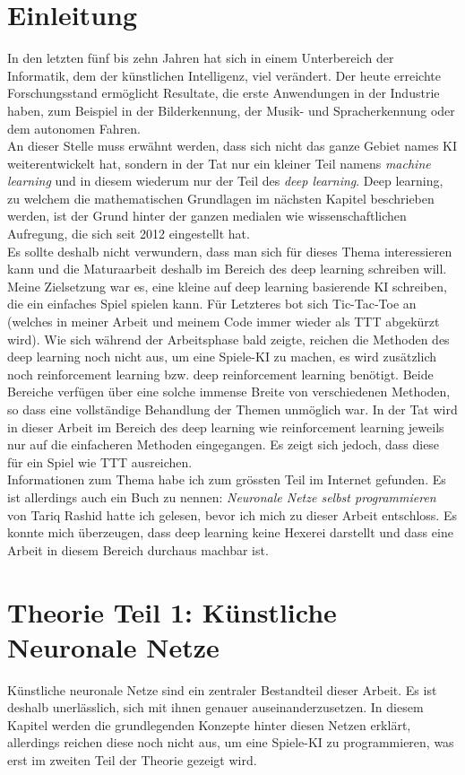 \documentclass[12pt,a4paper]{article}
\begin{document}
\section{Einleitung}
In den letzten fünf bis zehn Jahren hat sich in einem Unterbereich der Informatik, dem der künstlichen Intelligenz, viel verändert. Der heute erreichte Forschungsstand ermöglicht Resultate, die erste Anwendungen in der Industrie haben, zum Beispiel in der Bilderkennung, der Musik- und Spracherkennung oder dem autonomen Fahren. \cite{topdlapp}\\
An dieser Stelle muss erwähnt werden, dass sich nicht das ganze Gebiet names KI weiterentwickelt hat, sondern in der Tat nur ein kleiner Teil namens \textit{machine learning} und in diesem wiederum nur der Teil des \textit{deep learning}. Deep learning, zu welchem die mathematischen Grundlagen im nächsten Kapitel beschrieben werden, ist der Grund hinter der ganzen medialen wie wissenschaftlichen Aufregung, die sich seit 2012 eingestellt hat.\cite{dlrwiki}\\
Es sollte deshalb nicht verwundern, dass man sich für dieses Thema interessieren kann und die Maturaarbeit deshalb im Bereich des deep learning schreiben will.
Meine Zielsetzung war es, eine kleine auf deep learning basierende KI schreiben, die ein einfaches Spiel spielen kann. Für Letzteres bot sich Tic-Tac-Toe an (welches in meiner Arbeit und meinem Code immer wieder als TTT abgekürzt wird).
Wie sich während der Arbeitsphase bald zeigte, reichen die Methoden des deep learning noch nicht aus, um eine Spiele-KI zu machen, es wird zusätzlich noch reinforcement learning bzw. deep reinforcement learning benötigt. Beide Bereiche verfügen über eine solche immense Breite von verschiedenen Methoden, so dass eine vollständige Behandlung der Themen unmöglich war. In der Tat wird in dieser Arbeit im Bereich des deep learning wie reinforcement learning jeweils nur auf die einfacheren Methoden eingegangen. Es zeigt sich jedoch, dass diese für ein Spiel wie TTT ausreichen.\\
Informationen zum Thema habe ich zum grössten Teil im Internet gefunden. Es ist allerdings auch ein Buch zu nennen: \textit{Neuronale Netze selbst programmieren} von Tariq Rashid \cite{pinkbook} hatte ich gelesen, bevor ich mich zu dieser Arbeit entschloss. Es konnte mich überzeugen, dass deep learning keine Hexerei darstellt und dass eine Arbeit in diesem Bereich durchaus machbar ist.

\newpage
\section{Theorie Teil 1: Künstliche Neuronale Netze}
Künstliche neuronale Netze sind ein zentraler Bestandteil dieser Arbeit. Es ist deshalb unerlässlich, sich mit ihnen genauer auseinanderzusetzen. In diesem Kapitel werden die grundlegenden Konzepte hinter diesen Netzen erklärt, allerdings reichen diese noch nicht aus, um eine Spiele-KI zu programmieren, was erst im zweiten Teil der Theorie gezeigt wird.
\end{document}
